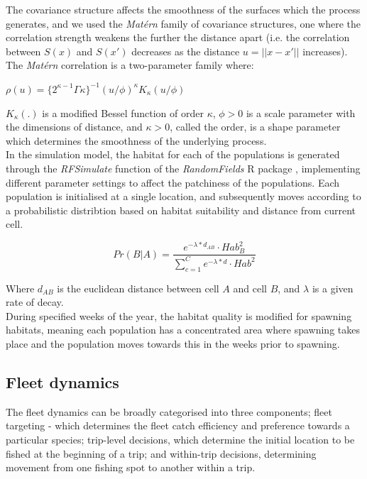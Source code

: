 \documentclass[review]{elsarticle}
\begin{document}
The covariance structure affects the smoothness of the surfaces which the
process generates, and we used the \textit{Matérn} family of covariance
structures, one where the correlation strength weakens the further the distance
apart (i.e. the correlation between $S(x)$ and $S(x')$ decreases as the
distance $u = ||x - x'||$ increases).  The \textit{Matérn} correlation is a
two-parameter family where: \\

\begin{center}
	$\rho(u) = \{2^{\kappa -
		1}\Gamma{\kappa}\}^{-1}(u/\phi)^{\kappa}K_{\kappa}(u/\phi)$
\end{center}
	
$K_{\kappa}(.)$ is a modified Bessel function of order $\kappa$, $\phi >
0$ is a scale parameter with the dimensions of distance, and $\kappa > 0$,
called the order, is a shape parameter which determines the smoothness of the
underlying process. \\

In the simulation model, the habitat for each of the populations is generated
through the \textit{RFSimulate} function of the \textit{RandomFields} R package
\cite{Schlater2015}, implementing different parameter settings to affect the
patchiness of the populations. Each population is initialised at a single
location, and subsequently moves according to a probabilistic distribtion based
on habitat suitability and distance from current cell. 

\begin{equation}
	Pr(B | A) = \frac{e^{-\lambda * d_{AB}} \cdot
		Hab_{B}^2}{\sum\limits_{c=1}^{C}e^{-\lambda * d} \cdot
		Hab^2}
\end{equation}

Where $d_{AB}$ is the euclidean distance between cell $A$ and cell $B$, and
$\lambda$ is a given rate of decay.\\

During specified weeks of the year, the habitat quality is modified for
spawning habitats, meaning each population has a concentrated area where
spawning takes place and the population moves towards this in the weeks prior
to spawning. \\

\subsection{Fleet dynamics}

The fleet dynamics can be broadly categorised into three components; fleet
targeting - which determines the fleet catch efficiency and preference towards
a particular species; trip-level decisions, which determine the initial
location to be fished at the beginning of a trip; and within-trip decisions,
determining movement from one fishing spot to another within a trip.
\end{document}
